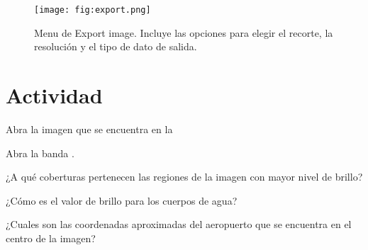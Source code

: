 \begin{figure}[h!]
    \centering
    \texttt{[image: fig:export.png]}
    \caption{Menu de Export image. Incluye las opciones para elegir el recorte, la resolución y el tipo de dato de salida.}
    \label{fig:export}
\end{figure}

\section{Actividad}

Abra la imagen que se encuentra en la
\begin{center}
\end{center}
Abra la banda .

\begin{que}
    ¿A qué coberturas pertenecen las regiones de la imagen con mayor nivel de brillo?
\end{que}

\begin{que}
    ¿Cómo es el valor de brillo para los cuerpos de agua?
\end{que}

\begin{que}
    ¿Cuales son las coordenadas aproximadas del aeropuerto que se encuentra en el centro de la imagen?
\end{que}
